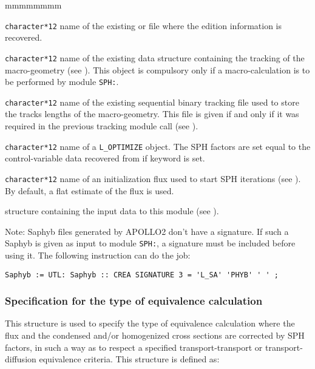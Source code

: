 \begin{ListeDeDescription}{mmmmmmmm}
\item[\dusa{APXNAM}] {\tt character*12} name of the existing  or  file where the
edition information is recovered.

\item[\dusa{TRKNAM}] {\tt character*12} name of the existing  data
structure containing the tracking of the macro-geometry (see ). This object
is compulsory only if a macro-calculation is to be performed by module {\tt SPH:}.

\item[\dusa{TRKFIL}] {\tt character*12} name of the existing sequential binary tracking
file used to store the tracks lengths of the macro-geometry. This file is given if and only if it was
required in the previous tracking module call (see ).

\item[\dusa{OPTIM}] {\tt character*12} name of a {\tt L\_OPTIMIZE} object. The
SPH factors are set equal to the control-variable data recovered from  if keyword  is set.

\item[\dusa{FLUNAM}] {\tt character*12} name of an initialization flux used to start SPH iterations (see ). By
default, a flat estimate of the flux is used.

\item[\dstr{descsph}] structure containing the input data to this module
(see ).

\end{ListeDeDescription}

Note: Saphyb files generated by APOLLO2 don't have a signature. If such a Saphyb is given as input
to module {\tt SPH:}, a signature must be included before using it. The following instruction
can do the job:
\begin{verbatim}
Saphyb := UTL: Saphyb :: CREA SIGNATURE 3 = 'L_SA' 'PHYB' ' ' ;
\end{verbatim}

\subsubsection{Specification for the type of equivalence calculation}\label{sect:descsph}

This structure is used to specify the type of equivalence calculation where the
flux and the condensed and/or homogenized cross sections are corrected by SPH
factors, in such a way as to respect a specified transport-transport or
transport-diffusion equivalence criteria.\cite{ALSB1,ALSB2,ALSB3} This
structure is defined as:

